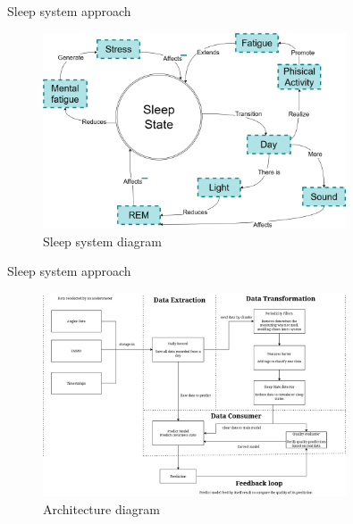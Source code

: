 \documentclass[10pt]{beamer} %
\begin{document}
\begin{frame}{Sleep system approach} %
          \begin{figure}
              \centering
             \includegraphics[width=0.8\textwidth]{figures/simulation.png} %
             \caption{Sleep system diagram} %
             \end{figure}
 
\end{frame}
\begin{frame}{Sleep system approach} %
          \begin{figure}
              \centering
             \includegraphics[width=0.8\textwidth]{figures/system.png} %
             \caption{Architecture diagram} %
             \end{figure}
 
\end{frame}
\end{document}
